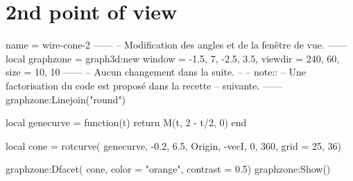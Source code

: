 \documentclass[varwidth, border = 3pt]{standalone}
\begin{document}
\section*{2nd point of view}

\begin{luadraw}{name = wire-cone-2}
------
-- Modification des angles et de la fenêtre de vue.
------
    local graphzone = graph3d:new{
        window  = {-1.5, 7, -2.5, 3.5},
        viewdir = {240, 60},
        size    = {10, 10}
    }
------
-- Aucun changement dans la suite.
--
-- note::
--     Une factorisation du code est proposé dans la recette
--     suivante.
------
    graphzone:Linejoin("round")

    local genecurve = function(t)
        return M(t, 2 - t/2, 0)
    end

    local cone = rotcurve(
        genecurve,
        -0.2, 6.5,
        {Origin, -vecI},
        0, 360,
        {grid = {25, 36}})

    graphzone:Dfacet(
        cone,
        {color    = "orange",
		 contrast = 0.5})
    graphzone:Show()
\end{luadraw}
\end{document}
